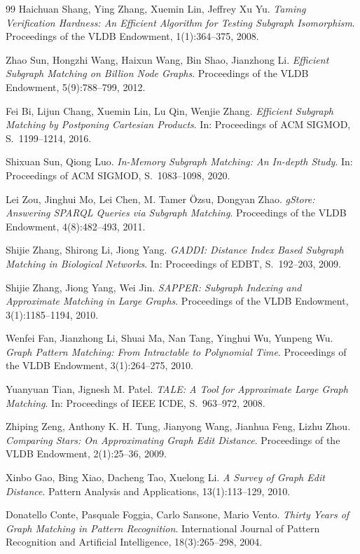 \documentclass[a4paper,12pt, twoside]{report}
\theoremstyle{definition}
\begin{document}
\begin{thebibliography}{99}
Haichuan Shang, Ying Zhang, Xuemin Lin, Jeffrey Xu Yu.
\emph{Taming Verification Hardness: An Efficient Algorithm for Testing Subgraph Isomorphism}.
Proceedings of the VLDB Endowment, 1(1):364--375, 2008.

Zhao Sun, Hongzhi Wang, Haixun Wang, Bin Shao, Jianzhong Li.
\emph{Efficient Subgraph Matching on Billion Node Graphs}.
Proceedings of the VLDB Endowment, 5(9):788--799, 2012.

Fei Bi, Lijun Chang, Xuemin Lin, Lu Qin, Wenjie Zhang.
\emph{Efficient Subgraph Matching by Postponing Cartesian Products}.
In: Proceedings of ACM SIGMOD, S.~1199--1214, 2016.

Shixuan Sun, Qiong Luo.
\emph{In-Memory Subgraph Matching: An In-depth Study}.
In: Proceedings of ACM SIGMOD, S.~1083--1098, 2020.

Lei Zou, Jinghui Mo, Lei Chen, M. Tamer Özsu, Dongyan Zhao.
\emph{gStore: Answering SPARQL Queries via Subgraph Matching}.
Proceedings of the VLDB Endowment, 4(8):482--493, 2011.

Shijie Zhang, Shirong Li, Jiong Yang.
\emph{GADDI: Distance Index Based Subgraph Matching in Biological Networks}.
In: Proceedings of EDBT, S.~192--203, 2009.

Shijie Zhang, Jiong Yang, Wei Jin.
\emph{SAPPER: Subgraph Indexing and Approximate Matching in Large Graphs}.
Proceedings of the VLDB Endowment, 3(1):1185--1194, 2010.

Wenfei Fan, Jianzhong Li, Shuai Ma, Nan Tang, Yinghui Wu, Yunpeng Wu.
\emph{Graph Pattern Matching: From Intractable to Polynomial Time}.
Proceedings of the VLDB Endowment, 3(1):264--275, 2010.

Yuanyuan Tian, Jignesh M. Patel.
\emph{TALE: A Tool for Approximate Large Graph Matching}.
In: Proceedings of IEEE ICDE, S.~963--972, 2008.

Zhiping Zeng, Anthony K. H. Tung, Jianyong Wang, Jianhua Feng, Lizhu Zhou.
\emph{Comparing Stars: On Approximating Graph Edit Distance}.
Proceedings of the VLDB Endowment, 2(1):25--36, 2009.

Xinbo Gao, Bing Xiao, Dacheng Tao, Xuelong Li.
\emph{A Survey of Graph Edit Distance}.
Pattern Analysis and Applications, 13(1):113--129, 2010.

Donatello Conte, Pasquale Foggia, Carlo Sansone, Mario Vento.
\emph{Thirty Years of Graph Matching in Pattern Recognition}.
International Journal of Pattern Recognition and Artificial Intelligence, 18(3):265--298, 2004.


\end{thebibliography}
\end{document}
